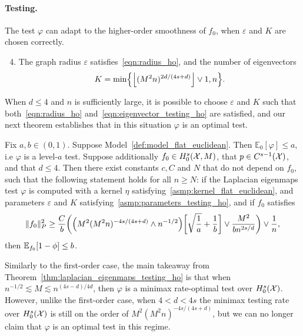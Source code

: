 \paragraph{Testing.} The test $\varphi$ can adapt to the higher-order smoothness of $f_0$, when $\varepsilon$ and $K$ are chosen correctly.
\begin{enumerate}[label=(P\arabic*)]
	\setcounter{enumi}{3}
	\item 
	\label{asmp:parameters_testing_ho}
	The graph radius $\varepsilon$ satisfies~\eqref{eqn:radius_ho}, and the number of eigenvectors
	\begin{equation}
	\label{eqn:eigenvector_testing_ho}
	K = \min\Bigl\{\left\lfloor (M^2n)^{2d/(4s + d)} \right\rfloor \vee 1, n\Bigr\}.
	\end{equation}
\end{enumerate}
When $d \leq 4$ and $n$ is sufficiently large, it is possible to choose $\varepsilon$ and $K$ such that both~\eqref{eqn:radius_ho} and~\eqref{eqn:eigenvector_testing_ho} are satisfied, and our next theorem establishes that in this situation $\varphi$ is an optimal test.
\begin{theorem}
	\label{thm:laplacian_eigenmaps_testing_ho}
	Fix $a,b \in (0,1)$. Suppose Model~\ref{def:model_flat_euclidean}. Then $\mathbb{E}_0[\varphi] \leq a$, i.e $\varphi$ is a level-$a$ test. Suppose additionally $f_0 \in H_0^s(\mathcal{X},M)$, that $p \in C^{s-1}(\mathcal{X})$, and that $d \leq 4$. Then there exist constants $c,C$ and $N$ that do not depend on $f_0$, such that the following statement holds for all $n \geq N$: if the Laplacian eigenmaps test $\varphi$ is computed with a kernel $\eta$ satisfying~\ref{asmp:kernel_flat_euclidean}, and parameters $\varepsilon$ and $K$ satisfying~\ref{asmp:parameters_testing_ho}, and if $f_0$ satisfies
	\begin{equation}
	\label{eqn:laplacian_eigenmaps_testing_criticalradius_ho}
	\|f_0\|_P^2 \geq \frac{C}{b}\biggl(\Bigl(M^2(M^2n)^{-4s/(4s + d) } \wedge n^{-1/2}\Bigr)\biggl[\sqrt{\frac{1}{a}} + \frac{1}{b}\biggr] \vee \frac{M^2}{b n^{2s/d}} \biggr) \vee \frac{1}{n},
	\end{equation}
	then $\mathbb{E}_{f_0}[1 - \phi] \leq b$.
\end{theorem}
Similarly to the first-order case, the main takeaway from Theorem~\ref{thm:laplacian_eigenmaps_testing_ho} is that when $n^{-1/2} \lesssim M \lesssim n^{(4s - d)/4d}$, then $\varphi$ is a minimax rate-optimal test over $H_0^s(\mathcal{X})$. However, unlike the first-order case, when $4 < d < 4s$ the minimax testing rate over $H_0^s(\mathcal{X})$ is still on the order of $M^2(M^2n)^{-4s/(4s + d)}$, but we can no longer claim that $\varphi$ is an optimal test in this regime.
